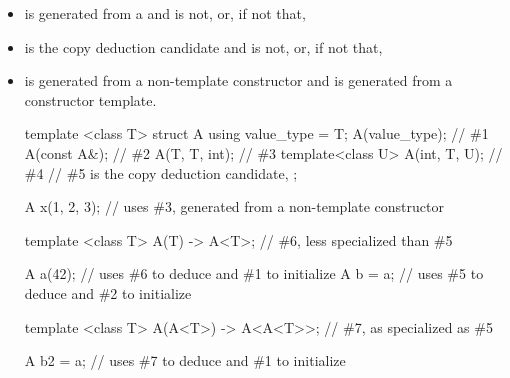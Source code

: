\begin{itemize}
\item
{} is generated from a
and  is not, or, if not that,

\item
{} is the copy deduction candidate
and  is not, or, if not that,

\item
{} is generated from a non-template constructor
and  is generated from a constructor template.
\begin{example}
\begin{codeblock}
template <class T> struct A {
  using value_type = T;
  A(value_type);    // \#1
  A(const A&);      // \#2
  A(T, T, int);     // \#3
  template<class U>
    A(int, T, U);   // \#4
  // \#5 is the copy deduction candidate, 
};

A x(1, 2, 3);       // uses \#3, generated from a non-template constructor

template <class T>
A(T) -> A<T>;       // \#6, less specialized than \#5

A a(42);            // uses \#6 to deduce  and \#1 to initialize
A b = a;            // uses \#5 to deduce  and \#2 to initialize

template <class T>
A(A<T>) -> A<A<T>>; // \#7, as specialized as \#5

A b2 = a;           // uses \#7 to deduce  and \#1 to initialize
\end{codeblock}
\end{example}
\end{itemize}

